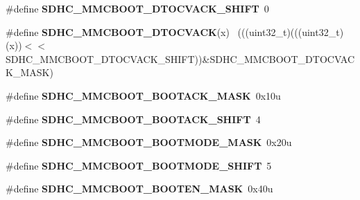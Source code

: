 \begin{DoxyCompactItemize}
\item 
\hypertarget{group___s_d_h_c___register___masks_ga63ba85bfa2ccf68011e8afcf6f2c03b4}{}\#define {\bfseries S\+D\+H\+C\+\_\+\+M\+M\+C\+B\+O\+O\+T\+\_\+\+D\+T\+O\+C\+V\+A\+C\+K\+\_\+\+S\+H\+I\+F\+T}~0\label{group___s_d_h_c___register___masks_ga63ba85bfa2ccf68011e8afcf6f2c03b4}

\item 
\hypertarget{group___s_d_h_c___register___masks_gaa0d698c460ad86e2bc6573e54879cb43}{}\#define {\bfseries S\+D\+H\+C\+\_\+\+M\+M\+C\+B\+O\+O\+T\+\_\+\+D\+T\+O\+C\+V\+A\+C\+K}(x)                              ~(((uint32\+\_\+t)(((uint32\+\_\+t)(x))$<$$<$S\+D\+H\+C\+\_\+\+M\+M\+C\+B\+O\+O\+T\+\_\+\+D\+T\+O\+C\+V\+A\+C\+K\+\_\+\+S\+H\+I\+F\+T))\&S\+D\+H\+C\+\_\+\+M\+M\+C\+B\+O\+O\+T\+\_\+\+D\+T\+O\+C\+V\+A\+C\+K\+\_\+\+M\+A\+S\+K)\label{group___s_d_h_c___register___masks_gaa0d698c460ad86e2bc6573e54879cb43}

\item 
\hypertarget{group___s_d_h_c___register___masks_ga878fce0feabab8806e311871a08386c9}{}\#define {\bfseries S\+D\+H\+C\+\_\+\+M\+M\+C\+B\+O\+O\+T\+\_\+\+B\+O\+O\+T\+A\+C\+K\+\_\+\+M\+A\+S\+K}~0x10u\label{group___s_d_h_c___register___masks_ga878fce0feabab8806e311871a08386c9}

\item 
\hypertarget{group___s_d_h_c___register___masks_gadd901321f62235462c051a551b132354}{}\#define {\bfseries S\+D\+H\+C\+\_\+\+M\+M\+C\+B\+O\+O\+T\+\_\+\+B\+O\+O\+T\+A\+C\+K\+\_\+\+S\+H\+I\+F\+T}~4\label{group___s_d_h_c___register___masks_gadd901321f62235462c051a551b132354}

\item 
\hypertarget{group___s_d_h_c___register___masks_ga0cdf366302c98d1227b0092048c0ac5a}{}\#define {\bfseries S\+D\+H\+C\+\_\+\+M\+M\+C\+B\+O\+O\+T\+\_\+\+B\+O\+O\+T\+M\+O\+D\+E\+\_\+\+M\+A\+S\+K}~0x20u\label{group___s_d_h_c___register___masks_ga0cdf366302c98d1227b0092048c0ac5a}

\item 
\hypertarget{group___s_d_h_c___register___masks_ga2f4f7807f581a3e18d0f1e9f151f74b3}{}\#define {\bfseries S\+D\+H\+C\+\_\+\+M\+M\+C\+B\+O\+O\+T\+\_\+\+B\+O\+O\+T\+M\+O\+D\+E\+\_\+\+S\+H\+I\+F\+T}~5\label{group___s_d_h_c___register___masks_ga2f4f7807f581a3e18d0f1e9f151f74b3}

\item 
\hypertarget{group___s_d_h_c___register___masks_ga0e740cc62404161ed68d4ce1ecf30971}{}\#define {\bfseries S\+D\+H\+C\+\_\+\+M\+M\+C\+B\+O\+O\+T\+\_\+\+B\+O\+O\+T\+E\+N\+\_\+\+M\+A\+S\+K}~0x40u\label{group___s_d_h_c___register___masks_ga0e740cc62404161ed68d4ce1ecf30971}


\end{DoxyCompactItemize}
